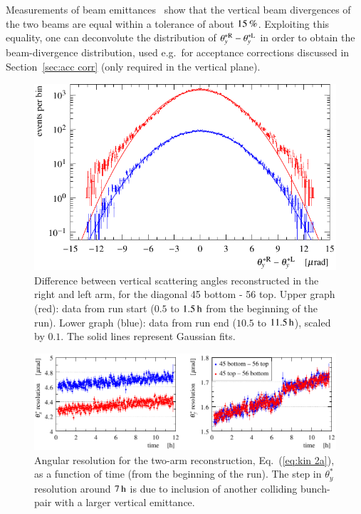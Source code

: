 Measurements of beam emittances~\cite{op-elog} show that the vertical beam divergences of the two beams are equal within a tolerance of about $15\,{\rm \%}$. Exploiting this equality, one can deconvolute the distribution of $\theta_y^{*\rm R} - \theta_y^{*\rm L}$ in order to obtain the beam-divergence distribution, used e.g.~for acceptance corrections discussed in Section~\ref{sec:acc corr} (only required in the vertical plane).

\begin{figure}
\begin{center}
\includegraphics{fig/beam_divergence_fits.pdf}
\vskip-4mm
\caption{%
Difference between vertical scattering angles reconstructed in the right and left arm, for the diagonal 45 bottom - 56 top. Upper graph (red): data from run start ($0.5$ to $1.5\,{\rm h}$ from the beginning of the run). Lower graph (blue): data from run end ($10.5$ to $11.5\,{\rm h}$), scaled by $0.1$. The solid lines represent Gaussian fits.
}
\label{fig:beam divergence}
\end{center}
\end{figure}



\begin{figure}
\begin{center}
\includegraphics{fig/resolutions_vs_time.pdf}
\vskip-4mm
\caption{%
Angular resolution for the two-arm reconstruction, Eq.~(\ref{eq:kin 2a}), as a function of time (from the beginning of the run). The step in $\theta_y^*$ resolution around $7\,{\rm h}$ is due to inclusion of another colliding bunch-pair with a larger vertical emittance.
}
\label{fig:resolutions}
\end{center}
\end{figure}





